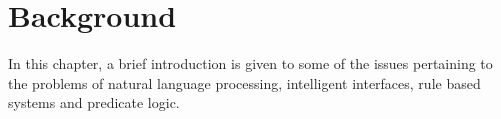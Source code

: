 
\chapter{Background}
\label{background}

In this chapter, a brief introduction is given to some of the issues
pertaining to the problems of natural language processing, intelligent
interfaces, rule based systems and predicate logic.




